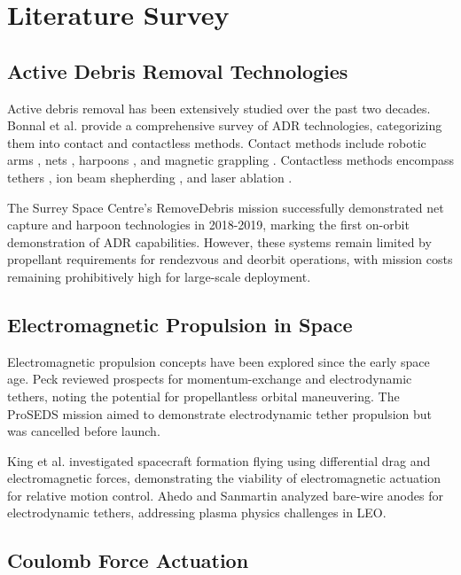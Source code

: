 \documentclass[12pt,a4paper]{article}
\begin{document}
\section{Literature Survey}

\subsection{Active Debris Removal Technologies}

Active debris removal has been extensively studied over the past two decades. Bonnal et al. \cite{bonnal2013active} provide a comprehensive survey of ADR technologies, categorizing them into contact and contactless methods. Contact methods include robotic arms \cite{flores2014review}, nets \cite{bischof2004roger}, harpoons \cite{aglietti2020removedebris}, and magnetic grappling \cite{nishida2006space}. Contactless methods encompass tethers \cite{pearson2010historical}, ion beam shepherding \cite{bombardelli2011ion}, and laser ablation \cite{phipps2012laser}.

The Surrey Space Centre's RemoveDebris mission \cite{aglietti2020removedebris} successfully demonstrated net capture and harpoon technologies in 2018-2019, marking the first on-orbit demonstration of ADR capabilities. However, these systems remain limited by propellant requirements for rendezvous and deorbit operations, with mission costs remaining prohibitively high for large-scale deployment.

\subsection{Electromagnetic Propulsion in Space}

Electromagnetic propulsion concepts have been explored since the early space age. Peck \cite{peck2005prospects} reviewed prospects for momentum-exchange and electrodynamic tethers, noting the potential for propellantless orbital maneuvering. The ProSEDS mission \cite{johnson2000propulsive} aimed to demonstrate electrodynamic tether propulsion but was cancelled before launch.

King et al. \cite{king2005spacecraft} investigated spacecraft formation flying using differential drag and electromagnetic forces, demonstrating the viability of electromagnetic actuation for relative motion control. Ahedo and Sanmartin \cite{ahedo2002analysis} analyzed bare-wire anodes for electrodynamic tethers, addressing plasma physics challenges in LEO.

\subsection{Coulomb Force Actuation}
\end{document}
